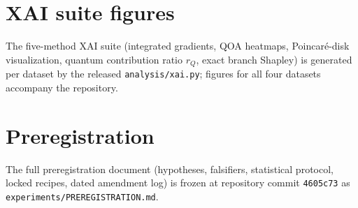 \documentclass[pdflatex,sn-mathphys-num]{sn-jnl}
\begin{document}
\begin{appendices}
\section{XAI suite figures}\label{app:xai}
The five-method XAI suite (integrated gradients, QOA heatmaps, Poincar\'e-disk visualization, quantum contribution ratio $r_Q$, exact branch Shapley) is generated per dataset by the released \texttt{analysis/xai.py}; figures for all four datasets accompany the repository.

\section{Preregistration}\label{app:prereg}
The full preregistration document (hypotheses, falsifiers, statistical protocol, locked recipes, dated amendment log) is frozen at repository commit \texttt{4605c73} as \texttt{experiments/PREREGISTRATION.md}.

\end{appendices}


\end{document}
